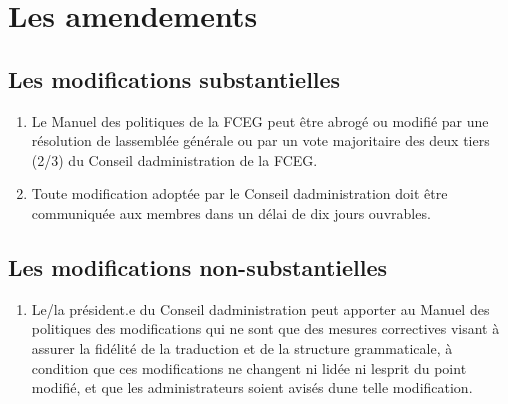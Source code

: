\section{Les amendements}
\label{les-amendements}

\subsection{Les modifications substantielles}
\label{les-modifications-substantielles}

\begin{enumerate}
 \item
  Le Manuel des politiques de la FCEG peut être abrogé ou modifié par une résolution de l\textquotesingle assemblée générale ou par un vote majoritaire des deux tiers (2/3) du Conseil d\textquotesingle administration de la FCEG.
 \item
  Toute modification adoptée par le Conseil d\textquotesingle administration doit être communiquée aux membres dans un délai de dix jours ouvrables.
\end{enumerate}

\subsection{Les modifications non-substantielles}
\label{les-modifications-non-substantielles}

\begin{enumerate}
 \item
  Le/la président.e du Conseil d\textquotesingle administration peut apporter au Manuel des politiques des modifications qui ne sont que des mesures correctives visant à assurer la fidélité de la traduction et de la structure grammaticale, à condition que ces modifications ne changent ni l\textquotesingle idée ni l\textquotesingle esprit du point modifié, et que les administrateurs soient avisés d\textquotesingle une telle modification.
\end{enumerate}
